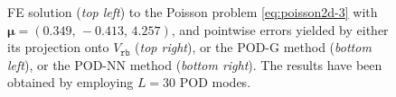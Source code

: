 \documentclass[12pt, a4paper, twoside, openright, notitlepage]{report}
\numberwithin{equation}{chapter}
\theoremstyle{theorem}
\theoremstyle{definition}
\theoremstyle{remark}
\theoremstyle{proposition}
\numberwithin{figure}{chapter}
\newcommand{\bg}[1]{\boldsymbol{#1}}
\begin{document}
\begin{figure}[H]
			
			
			\caption{FE solution (\emph{top left}) to the Poisson problem \eqref{eq:poisson2d-3} with $\bg{\mu} = (0.349, \, -0.413, \, 4.257)$, and pointwise errors yielded by either its projection onto $V_{\texttt{rb}}$ (\emph{top right}), or the POD-G method (\emph{bottom left}), or the POD-NN method (\emph{bottom right}). The results have been obtained by employing $L = 30$ POD modes.}
			\label{fig:poisson2d-3-fig1}
		\end{figure}	
		
\end{document}
